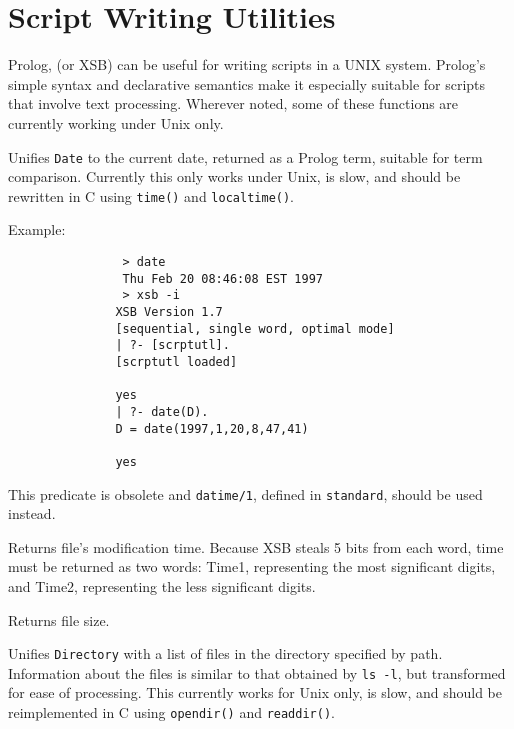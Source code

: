 \section{Script Writing Utilities}

Prolog, (or XSB) can be useful for writing scripts in a UNIX system.
Prolog's simple syntax and declarative semantics make it especially
suitable for scripts that involve text processing.  Wherever noted, some of
these functions are currently working under Unix only.

\begin{description}

Unifies {\tt Date} to the current date, returned as a Prolog term, suitable
for term comparison.  Currently this only works under Unix, is slow, and
should be rewritten in C using {\tt time()} and {\tt localtime()}.

Example:
{\footnotesize
\begin{verbatim}
                > date 
                Thu Feb 20 08:46:08 EST 1997
                > xsb -i
               XSB Version 1.7
               [sequential, single word, optimal mode]
               | ?- [scrptutl].
               [scrptutl loaded]

               yes
               | ?- date(D).
               D = date(1997,1,20,8,47,41)

               yes
\end{verbatim}}
  
  This predicate is obsolete and \verb|datime/1|, defined in
  \texttt{standard}, should be used instead.


Returns file's modification time. Because 
XSB steals 5 bits from each word, time must be returned as two words:
Time1, representing the most significant digits, and Time2, representing
the less significant digits.


Returns file size.


Unifies {\tt Directory} with a list of files in the directory specified by
path.  Information about the files is similar to that obtained by {\tt ls
  -l}, but transformed for ease of processing.  This currently works for
Unix only, is slow, and should be reimplemented in C using {\tt opendir()}
and {\tt readdir()}.



\end{description}
